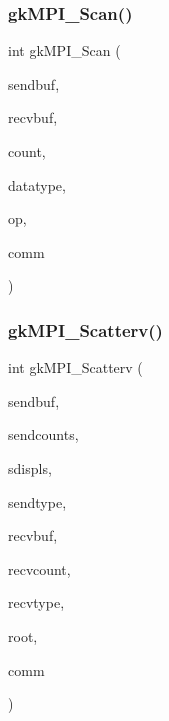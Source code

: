 \mbox{\label{a00359_a8f9cc3ccf10cef3753659c596da87bb3}} 
\subsubsection{\texorpdfstring{gk\+M\+P\+I\+\_\+\+Scan()}{gkMPI\_Scan()}}
{\footnotesize\ttfamily int gk\+M\+P\+I\+\_\+\+Scan (\begin{DoxyParamCaption}\item[{void $\ast$}]{sendbuf,  }\item[{void $\ast$}]{recvbuf,  }\item[{\hyperlink{a00876_aaa5262be3e700770163401acb0150f52}{idx\+\_\+t}}]{count,  }\item[{M\+P\+I\+\_\+\+Datatype}]{datatype,  }\item[{M\+P\+I\+\_\+\+Op}]{op,  }\item[{M\+P\+I\+\_\+\+Comm}]{comm }\end{DoxyParamCaption})}

\mbox{\label{a00359_a08990d66eed081828d6addc2e5affde3}} 
\subsubsection{\texorpdfstring{gk\+M\+P\+I\+\_\+\+Scatterv()}{gkMPI\_Scatterv()}}
{\footnotesize\ttfamily int gk\+M\+P\+I\+\_\+\+Scatterv (\begin{DoxyParamCaption}\item[{void $\ast$}]{sendbuf,  }\item[{\hyperlink{a00876_aaa5262be3e700770163401acb0150f52}{idx\+\_\+t} $\ast$}]{sendcounts,  }\item[{\hyperlink{a00876_aaa5262be3e700770163401acb0150f52}{idx\+\_\+t} $\ast$}]{sdispls,  }\item[{M\+P\+I\+\_\+\+Datatype}]{sendtype,  }\item[{void $\ast$}]{recvbuf,  }\item[{\hyperlink{a00876_aaa5262be3e700770163401acb0150f52}{idx\+\_\+t}}]{recvcount,  }\item[{M\+P\+I\+\_\+\+Datatype}]{recvtype,  }\item[{\hyperlink{a00876_aaa5262be3e700770163401acb0150f52}{idx\+\_\+t}}]{root,  }\item[{M\+P\+I\+\_\+\+Comm}]{comm }\end{DoxyParamCaption})}

